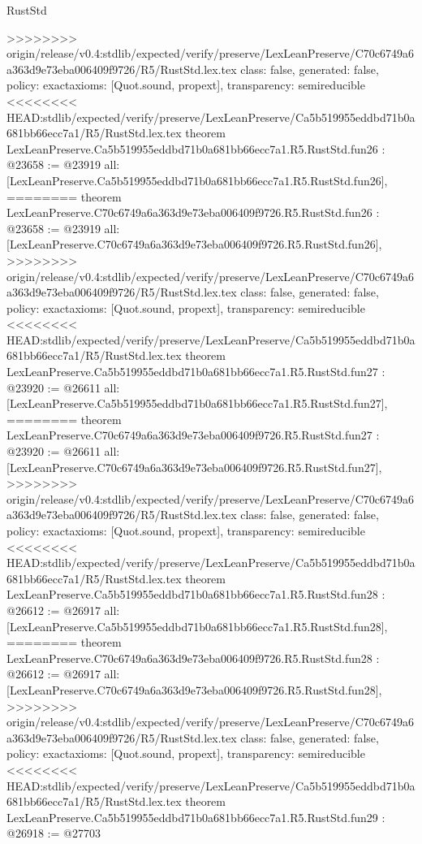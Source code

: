 \begin{lexlean}{RustStd}
\begin{coremodule}
{\begin{coremodule}
{{{{{{{{{{{{{{{{{{{{{{{{{{{{{>>>>>>>> origin/release/v0.4:stdlib/expected/verify/preserve/LexLeanPreserve/C70c6749a6a363d9e73eba006409f9726/R5/RustStd.lex.tex
  class: false,
  generated: false,
  policy: exact{axioms: [Quot.sound, propext]},
  transparency: semireducible
}
<<<<<<<< HEAD:stdlib/expected/verify/preserve/LexLeanPreserve/Ca5b519955eddbd71b0a681bb66ecc7a1/R5/RustStd.lex.tex
theorem LexLeanPreserve.Ca5b519955eddbd71b0a681bb66ecc7a1.R5.RustStd.fun26 : @23658 := @23919 {
  all: [LexLeanPreserve.Ca5b519955eddbd71b0a681bb66ecc7a1.R5.RustStd.fun26],
========
theorem LexLeanPreserve.C70c6749a6a363d9e73eba006409f9726.R5.RustStd.fun26 : @23658 := @23919 {
  all: [LexLeanPreserve.C70c6749a6a363d9e73eba006409f9726.R5.RustStd.fun26],
>>>>>>>> origin/release/v0.4:stdlib/expected/verify/preserve/LexLeanPreserve/C70c6749a6a363d9e73eba006409f9726/R5/RustStd.lex.tex
  class: false,
  generated: false,
  policy: exact{axioms: [Quot.sound, propext]},
  transparency: semireducible
}
<<<<<<<< HEAD:stdlib/expected/verify/preserve/LexLeanPreserve/Ca5b519955eddbd71b0a681bb66ecc7a1/R5/RustStd.lex.tex
theorem LexLeanPreserve.Ca5b519955eddbd71b0a681bb66ecc7a1.R5.RustStd.fun27 : @23920 := @26611 {
  all: [LexLeanPreserve.Ca5b519955eddbd71b0a681bb66ecc7a1.R5.RustStd.fun27],
========
theorem LexLeanPreserve.C70c6749a6a363d9e73eba006409f9726.R5.RustStd.fun27 : @23920 := @26611 {
  all: [LexLeanPreserve.C70c6749a6a363d9e73eba006409f9726.R5.RustStd.fun27],
>>>>>>>> origin/release/v0.4:stdlib/expected/verify/preserve/LexLeanPreserve/C70c6749a6a363d9e73eba006409f9726/R5/RustStd.lex.tex
  class: false,
  generated: false,
  policy: exact{axioms: [Quot.sound, propext]},
  transparency: semireducible
}
<<<<<<<< HEAD:stdlib/expected/verify/preserve/LexLeanPreserve/Ca5b519955eddbd71b0a681bb66ecc7a1/R5/RustStd.lex.tex
theorem LexLeanPreserve.Ca5b519955eddbd71b0a681bb66ecc7a1.R5.RustStd.fun28 : @26612 := @26917 {
  all: [LexLeanPreserve.Ca5b519955eddbd71b0a681bb66ecc7a1.R5.RustStd.fun28],
========
theorem LexLeanPreserve.C70c6749a6a363d9e73eba006409f9726.R5.RustStd.fun28 : @26612 := @26917 {
  all: [LexLeanPreserve.C70c6749a6a363d9e73eba006409f9726.R5.RustStd.fun28],
>>>>>>>> origin/release/v0.4:stdlib/expected/verify/preserve/LexLeanPreserve/C70c6749a6a363d9e73eba006409f9726/R5/RustStd.lex.tex
  class: false,
  generated: false,
  policy: exact{axioms: [Quot.sound, propext]},
  transparency: semireducible
}
<<<<<<<< HEAD:stdlib/expected/verify/preserve/LexLeanPreserve/Ca5b519955eddbd71b0a681bb66ecc7a1/R5/RustStd.lex.tex
theorem LexLeanPreserve.Ca5b519955eddbd71b0a681bb66ecc7a1.R5.RustStd.fun29 : @26918 := @27703 {
}}}}}}}}}}}}}}}}}}}}}}}}}}}}}}}}
\end{coremodule}}
\end{coremodule}
\end{lexlean}
